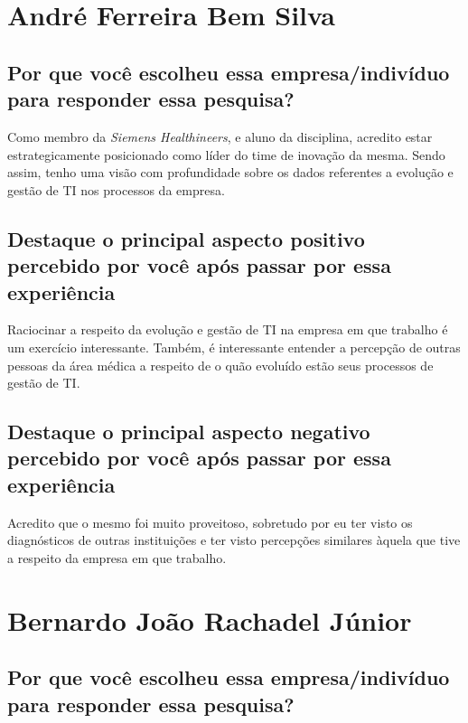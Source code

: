 \label{chap:ficha}

\section{André Ferreira Bem Silva}

\subsection{Por que você escolheu essa empresa/indivíduo para responder essa pesquisa?}

Como membro da \emph{Siemens Healthineers}, e aluno da disciplina, acredito estar estrategicamente posicionado como líder do time de inovação da mesma. Sendo assim, tenho uma visão com profundidade sobre os dados referentes a evolução e gestão de TI nos processos da empresa.

\subsection{Destaque o principal aspecto positivo percebido por você após passar por essa experiência}

Raciocinar a respeito da evolução e gestão de TI na empresa em que trabalho é um exercício interessante. Também, é interessante entender a percepção de outras pessoas da área médica a respeito de o quão evoluído estão seus processos de gestão de TI.

\subsection{Destaque o principal aspecto negativo percebido por você após passar por essa experiência}

Acredito que o mesmo foi muito proveitoso, sobretudo por eu ter visto os diagnósticos de outras instituições e ter visto percepções similares àquela que tive a respeito da empresa em que trabalho.

\section{Bernardo João Rachadel Júnior}

\subsection{Por que você escolheu essa empresa/indivíduo para responder essa pesquisa?}

